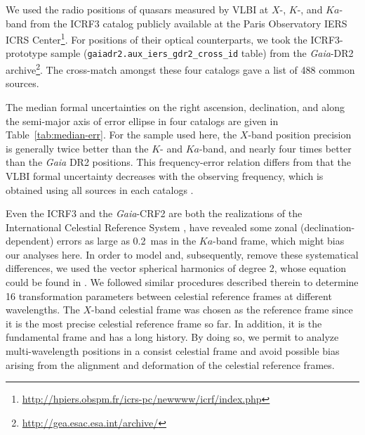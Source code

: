 \documentclass{aa}
\begin{document}
   We used the radio positions of quasars measured by VLBI at $X$-, $K$-, and $Ka$-band from the ICRF3 catalog publicly available at the Paris Observatory IERS ICRS Center\footnote{\url{http://hpiers.obspm.fr/icrs-pc/newwww/icrf/index.php}}.
   For positions of their optical counterparts, we took the ICRF3-prototype sample (\texttt{gaiadr2.aux\_iers\_gdr2\_cross\_id} table) from the \textit{Gaia}-DR2 archive\footnote{\url{http://gea.esac.esa.int/archive/}}.
   The cross-match amongst these four catalogs gave a list of 488 common sources.

   The median formal uncertainties on the right ascension, declination, and along the semi-major axis of error ellipse in four catalogs are given in Table~\ref{tab:median-err}.
   For the sample used here, the $X$-band position precision is generally twice better than the $K$- and $Ka$-band, and nearly four times better than the \textit{Gaia} DR2 positions.
   This frequency-error relation differs from that the VLBI formal uncertainty decreases with the observing frequency, which is obtained using all sources in each catalogs \citep{2020A&A...634A..28L}.

   Even the ICRF3 and the \textit{Gaia}-CRF2 are both the realizations of the International Celestial Reference System \citep[ICRS;][]{1995A&A...303..604A,1998A&A...331L..33F}, \citet{2020A&A...634A..28L} have revealed some zonal (declination-dependent) errors as large as 0.2~mas in the $Ka$-band frame, which might bias our analyses here.
   In order to model and, subsequently, remove these systematical differences, we used the vector spherical harmonics \citep[VSH;][]{2012A&A...547A..59M} of degree 2, whose equation could be found in \citet[][their Eq.~(1)]{2020A&A...634A..28L}.
   We followed similar procedures described therein to determine 16 transformation parameters between celestial reference frames at different wavelengths.
   The $X$-band celestial frame was chosen as the reference frame since it is the most precise celestial reference frame so far.
   In addition, it is the fundamental frame and has a long history.
   By doing so, we permit to analyze multi-wavelength positions in a consist celestial frame and avoid possible bias arising from the alignment and deformation of the celestial reference frames.
\end{document}
